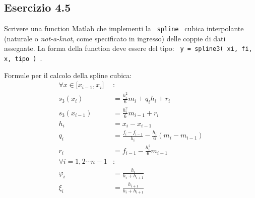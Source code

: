 	\subsection {Esercizio 4.5}
Scrivere una function Matlab che implementi la \texttt { spline } cubica interpolante (naturale o \textit{not-a-knot}, come specificato in ingresso) delle coppie di dati assegnate. La forma della function deve essere del tipo: \texttt { y = spline3( xi, fi, x, tipo ) }.

Formule per il calcolo della spline cubica:
\begin{equation*}
	\begin{split}
		\forall x \in \lbrack x_{i-1}, x_i \rbrack & : \\
		s_3(x_i) & = \frac{h_i^2}{6}m_i + q_i h_i +r_i \\
		s_3(x_{i-1}) & = \frac{h_i^2}{6}m_{i-1} + r_i \\
		h_i & = x_i - x_{i-1} \\
		q_i & = \frac{f_i - f_{i-1}}{h_i} - \frac{h_i}{6}(m_i -m_{i-1})\\ 
		r_i &= f_{i-1}  - \frac{h_i^2}{6}m_{i-1} \\
		\forall i = 1, 2 \cdots n-1 & : \\
		\varphi_i & = \frac{h_i}{h_i+h_{i+1}} \\
		\xi_i & = \frac{h_{i+1}}{h_i+h_{i+1}} 
	\end{split}
\end{equation*}

